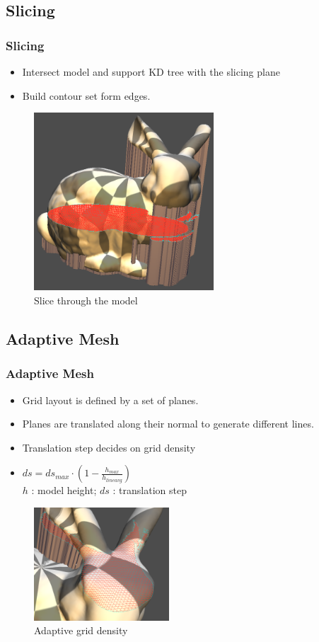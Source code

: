 \documentclass{beamer}
\begin{document}
\subsection{Slicing}
\begin{frame}
\frametitle{Slicing} 
 \begin{itemize}
  \item Intersect model and support KD tree with the slicing plane
  \item Build contour set form edges.
 \end{itemize}
\begin{figure}
\centering
\includegraphics[width=0.6\textwidth]{slice}
\caption{Slice through the model}
\end{figure}
\end{frame}

\subsection{Adaptive Mesh}
\begin{frame}
\frametitle{Adaptive Mesh} 
 \begin{itemize}
  \item Grid layout is defined by a set of planes.
  \item Planes are translated along their normal to generate different lines.
  \item Translation step decides on grid density
  \item $ds = ds_{max} \cdot \left(1 - \frac{h_{max}}{h_{line avg}}\right)$ \\
      $h$ : model height; $ds$ : translation step
 \end{itemize}
\begin{figure}
\centering
\includegraphics[width=0.45\textwidth]{slice1}
\caption{Adaptive grid density}
\end{figure}
\end{frame}
\end{document}
